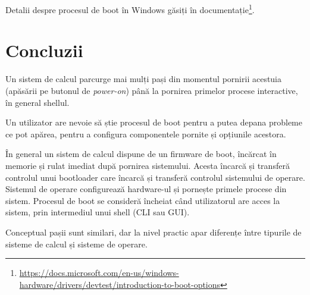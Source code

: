 Detalii despre procesul de boot în Windows găsiți în documentație\footnote{\url{https://docs.microsoft.com/en-us/windows-hardware/drivers/devtest/introduction-to-boot-options}}.

\section{Concluzii}
\label{sec:boot:conclusion}

Un sistem de calcul parcurge mai mulți pași din momentul pornirii acestuia (apăsării pe butonul de \textit{power-on}) până la pornirea primelor procese interactive, în general shellul.

Un utilizator are nevoie să știe procesul de boot pentru a putea depana probleme ce pot apărea, pentru a configura componentele pornite și opțiunile acestora.

În general un sistem de calcul dispune de un firmware de boot, încărcat în memorie și rulat imediat după pornirea sistemului.
Acesta încarcă și transferă controlul unui bootloader care încarcă și transferă controlul sistemului de operare.
Sistemul de operare configurează hardware-ul și pornește primele procese din sistem.
Procesul de boot se consideră încheiat când utilizatorul are acces la sistem, prin intermediul unui shell (CLI sau GUI).

Conceptual pașii sunt similari, dar la nivel practic apar diferențe între tipurile de sisteme de calcul și sisteme de operare.
